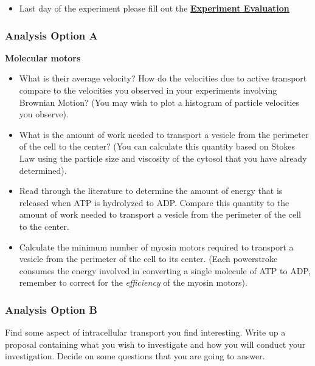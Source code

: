 \documentclass{../lab}
\begin{document}
\begin{itemize}
    \item Last day of the experiment please fill out the \href{\ExperimentEvaluation}{\textbf{Experiment Evaluation}}

\end{itemize}

\subsubsection{Analysis Option A}

\textbf{Molecular motors}

\begin{itemize}
    \item What is their average velocity? How do the velocities due to active transport compare to the velocities you observed in your experiments involving Brownian Motion? (You may wish to plot a histogram of particle velocities you observe).

    \item What is the amount of work needed to transport a vesicle from the perimeter of the cell to the center? (You can calculate this quantity based on Stokes Law using the particle size and viscosity of the cytosol that you have already determined).

    \item Read through the literature to determine the amount of energy that is released when ATP is hydrolyzed to ADP. Compare this quantity to the amount of work needed to transport a vesicle from the perimeter of the cell to the center.

    \item Calculate the minimum number of myosin motors required to transport a vesicle from the perimeter of the cell to its center. (Each powerstroke consumes the energy involved in converting a single molecule of ATP to ADP, remember to correct for the \emph{efficiency} of the myosin motors).
\end{itemize}

\subsubsection{Analysis Option B}

Find some aspect of intracellular transport you find interesting. Write up a proposal containing what you wish to investigate and how you will conduct your investigation. Decide on some questions that you are going to answer.
\end{document}
